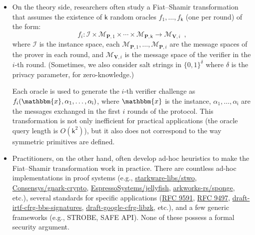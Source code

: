 \documentclass{article}
\begin{document}
\begin{itemize}
    \item On the theory side, researchers often study a Fiat--Shamir transformation that assumes the existence of $\mathsf{k}$ random oracles $f_1, \dots, f_{\mathsf{k}}$ (one per round) of the form:
\begin{equation*}
    f_i: \mathcal{I} \times \mathcal{M}_{\mathbf{P}, 1} \times \cdots \times \mathcal{M}_{\mathbf{P}, \mathsf{k}} \to \mathcal{M}_{\mathbf{V}, i}\enspace,
\end{equation*}
where \(\mathcal{I}\) is the instance space,  each \( \mathcal{M}_{\mathbf{P}, 1}, \dots, \mathcal{M}_{\mathbf{P}, i} \) are the message spaces of the prover in each round, and \( \mathcal{M}_{\mathbf{V}, i} \) is the message space of the verifier in the \(i\)-th round. (Sometimes, we also consider salt strings in \(\{0, 1\}^\delta\) where \(\delta\) is the privacy parameter, for zero-knowledge.)

Each oracle is used to generate the \(i\)-th verifier challenge as \(f_i(\mathbbm{x}, \alpha_1, \dots, \alpha_{\mathsf{i}})\), where \(\mathbbm{x}\) is the instance, \(\alpha_1, \dots, \alpha_{\mathsf{i}}\) are the messages exchanged in the first \(i\) rounds of the protocol.
This transformation is not only inefficient for practical applications (the oracle query length is $O(\mathsf{k}^2)$), but it also does not correspond to the way symmetric primitives are defined.

    \item Practitioners, on the other hand, often develop ad-hoc heuristics to make the Fiat--Shamir transformation work in practice. There are countless ad-hoc implementations in proof systems (e.g., \href{https://github.com/starkware-libs/stwo}{starkware-libs/stwo}, \href{https://github.com/Consensys/gnark-crypto}{Consensys/gnark-crypto}, \href{https://github.com/EspressoSystems/jellyfish}{EspressoSystems/jellyfish}, \href{https://github.com/arkworks-rs/sponge}{arkworks-rs/sponge}, etc.), several standards for specific applications (\href{https://datatracker.ietf.org/doc/rfc9591/}{RFC 9591}, \href{https://datatracker.ietf.org/doc/rfc9497/}{RFC 9497}, \href{https://datatracker.ietf.org/doc/draft-irtf-cfrg-bbs-signatures/}{draft-irtf-cfrg-bbs-signatures}, \href{https://datatracker.ietf.org/doc/draft-google-cfrg-libzk/}{draft-google-cfrg-libzk}, etc.), and a few generic frameworks (e.g., STROBE, SAFE API). None of these possess a formal security argument.
\end{itemize}
\end{document}
